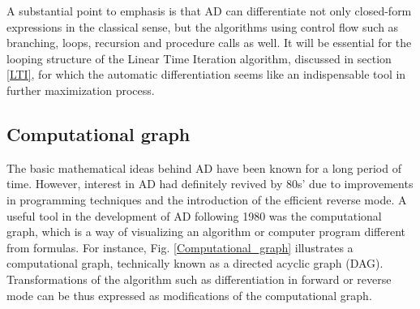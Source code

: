 \documentclass{pracamgr}
\numberwithin{equation}{section}
\begin{document}
A substantial point to emphasis is that AD can differentiate not only closed-form expressions in the classical sense, but the algorithms using control flow such as branching, loops, recursion and procedure calls as well. It will be essential for the looping structure of the Linear Time Iteration algorithm, discussed in section \ref{LTI}, for which the automatic differentiation seems like an indispensable tool in further maximization process.

\subsection{Computational graph}

The basic mathematical ideas behind AD have been known for a long period of time. However, interest in AD had definitely revived by 80s' due to improvements in programming techniques and the introduction of the efficient reverse mode. A useful tool in the development of AD following 1980 was the computational graph, which is a way of visualizing an algorithm or computer program different from formulas. For instance, Fig. \ref{Computational_graph} illustrates a computational graph, technically known as a directed acyclic graph (DAG). Transformations of the algorithm such as differentiation in forward or reverse mode can be thus expressed as modifications of the computational graph.
\end{document}
